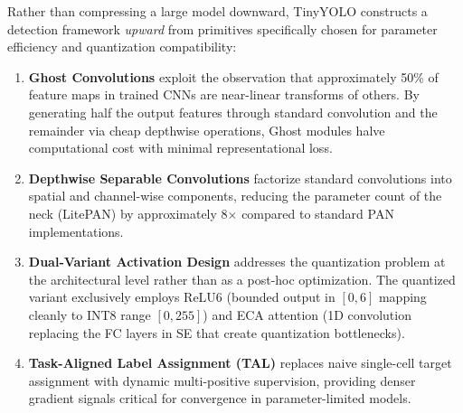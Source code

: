 \documentclass[conference]{IEEEtran}
\begin{document}
Rather than compressing a large model downward, TinyYOLO constructs a detection framework \textit{upward} from primitives specifically chosen for parameter efficiency and quantization compatibility:
\begin{enumerate}
\item \textbf{Ghost Convolutions} \cite{han2020ghostnet} exploit the observation that approximately 50\% of feature maps in trained CNNs are near-linear transforms of others. By generating half the output features through standard convolution and the remainder via cheap depthwise operations, Ghost modules halve computational cost with minimal representational loss.
\item \textbf{Depthwise Separable Convolutions} \cite{howard2017mobilenets} factorize standard convolutions into spatial and channel-wise components, reducing the parameter count of the neck (LitePAN) by approximately 8$\times$ compared to standard PAN implementations.
\item \textbf{Dual-Variant Activation Design} addresses the quantization problem at the architectural level rather than as a post-hoc optimization. The quantized variant exclusively employs ReLU6 (bounded output in $[0, 6]$ mapping cleanly to INT8 range $[0, 255]$) and ECA attention (1D convolution replacing the FC layers in SE that create quantization bottlenecks).
\item \textbf{Task-Aligned Label Assignment (TAL)} \cite{feng2021tood} replaces naive single-cell target assignment with dynamic multi-positive supervision, providing denser gradient signals critical for convergence in parameter-limited models.
\end{enumerate}
\end{document}
